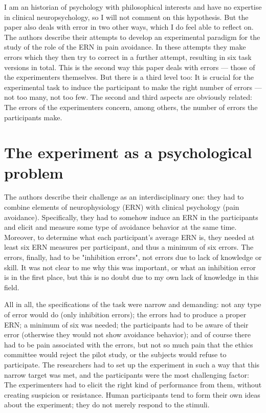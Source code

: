 \documentclass[twocolumn, serif, authordate, reflection]{jote-article}
\begin{document}
I am an historian of psychology with philosophical interests and have no expertise in clinical neuropsychology, so I will not comment on this hypothesis. But the paper also deals with error in two other ways, which I do feel able to reflect on. The authors describe their attempts to develop an experimental paradigm for the study of the role of the ERN in pain avoidance. In these attempts they make errors which they then try to correct in a further attempt, resulting in six task versions in total. This is the second way this paper deals with errors — those of the experimenters themselves. But there is a third level too: It is crucial for the experimental task to induce the participant to make the right number of errors — not too many, not too few. The second and third aspects are obviously related: The errors of the experimenters concern, among others, the number of errors the participants make.


  {}\section*{The experiment as a psychological problem} 

The authors describe their challenge as an interdisciplinary one: they had to combine elements of neurophysiology (ERN) with clinical psychology (pain avoidance). Specifically, they had to somehow induce an ERN in the participants and elicit and measure some type of avoidance behavior at the same time. Moreover, to determine what each participant's average ERN is, they needed at least six ERN measures per participant, and thus a minimum of six errors. The errors, finally, had to be "inhibition errors", not errors due to lack of knowledge or skill. It was not clear to me why this was important, or what an inhibition error is in the first place, but this is no doubt due to my own lack of knowledge in this field.

All in all, the specifications of the task were narrow and demanding: not any type of error would do (only inhibition errors); the errors had to produce a proper ERN; a minimum of six was needed; the participants had to be aware of their error (otherwise they would not show avoidance behavior); and of course there had to be pain associated with the errors, but not so much pain that the ethics committee would reject the pilot study, or the subjects would refuse to participate. The researchers had to set up the experiment in such a way that this narrow target was met, and the participants were the most challenging factor: The experimenters had to elicit the right kind of performance from them, without creating suspicion or resistance. Human participants tend to form their own ideas about the experiment; they do not merely respond to the stimuli.
\end{document}
